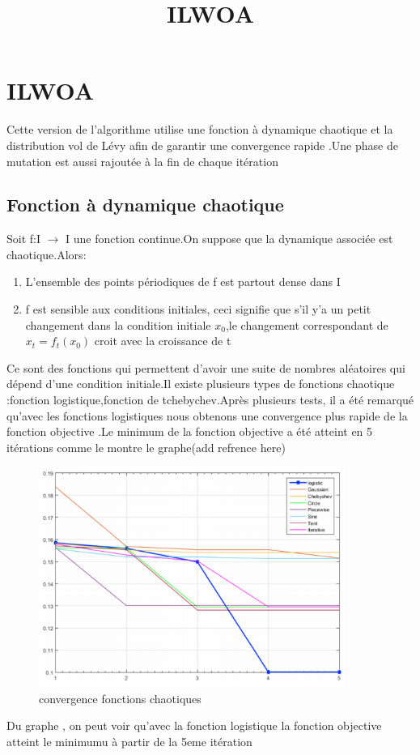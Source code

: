 \documentclass[12pt]{article}
\title{ILWOA}
\begin{document}
\section{ILWOA}
    Cette version de l'algorithme utilise une fonction à dynamique chaotique et la distribution vol de Lévy afin de garantir une convergence rapide .Une phase de mutation est aussi rajoutée à la fin de chaque itération
\subsection{Fonction à dynamique chaotique}
Soit f:I $\rightarrow$ I une fonction continue.On suppose que la dynamique associée est chaotique.Alors:
\begin{enumerate}
    \item L'ensemble des points périodiques de f est partout dense dans I 
    \item f est sensible aux conditions initiales, ceci signifie que s'il y'a un petit changement dans la condition initiale $x_0$,le changement correspondant de $x_t=f_t(x_0)$ croit avec la croissance de t 
\end{enumerate}
Ce sont des fonctions qui permettent d'avoir une suite de nombres aléatoires qui dépend d'une condition initiale.Il existe plusieurs types de fonctions chaotique :fonction logistique,fonction de tchebychev.Après plusieurs tests, il a été remarqué qu'avec les fonctions logistiques nous obtenons une convergence plus rapide de la fonction objective .Le minimum de la fonction objective a été atteint en 5 itérations comme le montre le graphe(add refrence here)
\begin{figure}[h!]
   \centering
    \includegraphics[width=10cm]{../figures/logisticvsothers.PNG}
    \caption[\small]{convergence fonctions chaotiques}
\end{figure}
Du graphe , on peut voir qu'avec la fonction logistique la fonction objective atteint le minimumu à partir de la 5eme itération
\end{document}
